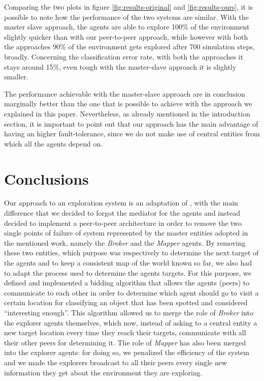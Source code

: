 \documentclass[a4paper, 10pt, conference]{ieeeconf}      %
\begin{document}
Comparing the two plots in figure \ref{fig:results-original} and \ref{fig:results-ours}, it is possible to note how the performance of the two systems are similar. With the master slave approach, the agents are able to explore 100\% of the environment slightly quicker than with our peer-to-peer approach, while however with both the approaches 90\% of the environment gets explored after 700 simulation steps, broadly. Concerning the classification error rate, with both the approaches it stays around 15\%, even tough with the master-slave approach it is slightly smaller. 

The performance achievable with the master-slave approach are in conclusion marginally better than the one that is possible to achieve with the approach we explained in this paper. Nevertheless, as already mentioned in the introduction section, it is important to point out that our approach has the main advantage of having an higher fault-tolerance, since we do not make use of central entities from which all the agents depend on. 





\section{Conclusions}
Our approach to an exploration system is an adaptation of \cite{tavaresgaspar}, with the main difference that we decided to forgot the mediator for the agents and instead decided to implement a peer-to-peer architecture in order to remove the two single points of failure of system represented by the master entities adopted in the mentioned work, namely the \emph{Broker} and the \emph{Mapper} agents. By removing these two entities, which purpose was respectively to determine the next target of the agents and to keep a consistent map of the world known so far, we also had to adapt the process used to determine the agents targets. For this purpose, we defined and implemented a bidding algorithm that allows the agents (peers) to communicate to each other in order to determine which agent should go to visit a certain location for classifying an object that has been spotted and considered ``interesting enough''. This algorithm allowed us to merge the role of \emph{Broker} into the explorer agents themselves, which now, instead of asking to a central entity a new target location every time they reach their targets, communicate with all their other peers for determining it. The role of \emph{Mapper} has also been merged into the explorer agents: for doing so, we penalized the efficiency of the system and we made the explorers broadcast to all their peers every single new information they get about the environment they are exploring. 
\end{document}
